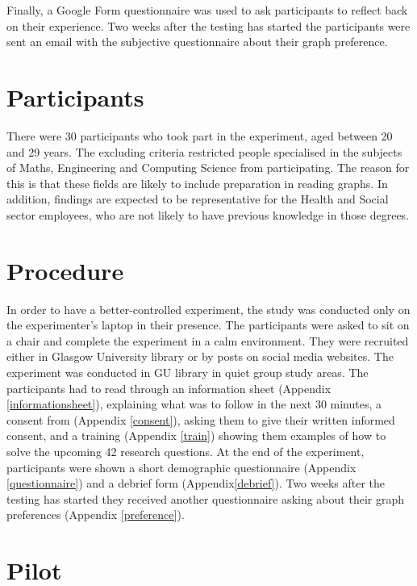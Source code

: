 \documentclass{l4proj}
\begin{document}
Finally, a Google Form questionnaire was used to ask participants to reflect back on their experience. Two weeks after the testing has started the participants were sent an email with the subjective questionnaire about their graph preference. 

\section{Participants}
There were 30 participants who took part in the experiment, aged between 20 and 29 years. The excluding criteria restricted people specialised in the subjects of Maths, Engineering and Computing Science from participating. The reason for this is that these fields are likely to include preparation in reading graphs. In addition, findings are expected to be representative for the Health and Social sector employees, who are not likely to have previous knowledge in those degrees.

\section{Procedure}

In order to have a better-controlled experiment, the study was conducted only on the experimenter's laptop in their presence. The participants were asked to sit on a chair and complete the experiment in a calm environment. They were recruited either in Glasgow University library or by posts on social media websites. The experiment was conducted in GU library in quiet group study areas. The participants had to read through an information sheet (Appendix \ref{informationsheet}), explaining what was to follow in the next 30 minutes, a consent from (Appendix \ref{consent}), asking them to give their written informed consent, and a training (Appendix \ref{train}) showing them examples of how to solve the upcoming 42 research questions. At the end of the experiment, participants were shown a short demographic questionnaire (Appendix \ref{questionnaire}) and a debrief form (Appendix\ref{debrief}). Two weeks after the testing has started they received another questionnaire asking about their graph preferences (Appendix \autoref{preference}).


\section{Pilot}
\end{document}
